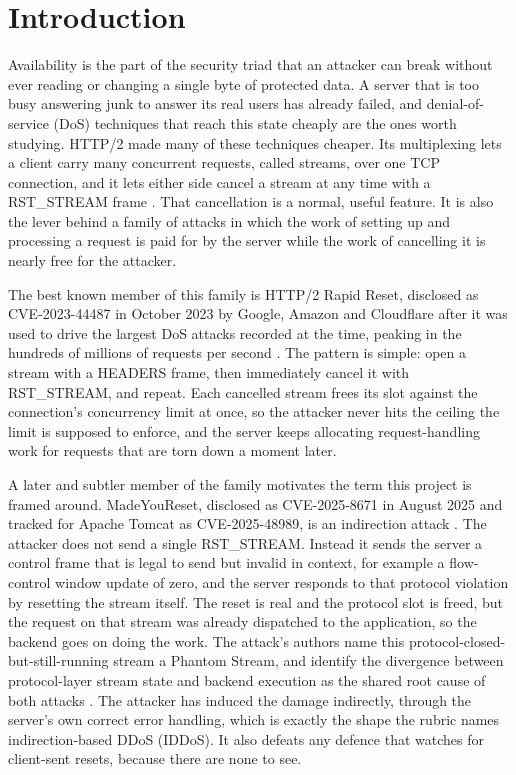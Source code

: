 \documentclass[a4paper,fleqn]{cas-dc}
\begin{document}
\section{Introduction}\label{sec:introduction}

Availability is the part of the security triad that an attacker can break without ever reading or changing a single byte of protected data. A server that is too busy answering junk to answer its real users has already failed, and denial-of-service (DoS) techniques that reach this state cheaply are the ones worth studying. HTTP/2 made many of these techniques cheaper. Its multiplexing lets a client carry many concurrent requests, called streams, over one TCP connection, and it lets either side cancel a stream at any time with a RST\_STREAM frame \cite{rfc9113}. That cancellation is a normal, useful feature. It is also the lever behind a family of attacks in which the work of setting up and processing a request is paid for by the server while the work of cancelling it is nearly free for the attacker.

The best known member of this family is HTTP/2 Rapid Reset, disclosed as CVE-2023-44487 in October 2023 by Google, Amazon and Cloudflare after it was used to drive the largest DoS attacks recorded at the time, peaking in the hundreds of millions of requests per second \cite{rapidresetCloudflare,cisaRapidReset}. The pattern is simple: open a stream with a HEADERS frame, then immediately cancel it with RST\_STREAM, and repeat. Each cancelled stream frees its slot against the connection's concurrency limit at once, so the attacker never hits the ceiling the limit is supposed to enforce, and the server keeps allocating request-handling work for requests that are torn down a moment later.

A later and subtler member of the family motivates the term this project is framed around. MadeYouReset, disclosed as CVE-2025-8671 in August 2025 and tracked for Apache Tomcat as CVE-2025-48989, is an indirection attack \cite{madeyouresetCloudflare,certccMadeYouReset,cve20258671,cve202548989}. The attacker does not send a single RST\_STREAM. Instead it sends the server a control frame that is legal to send but invalid in context, for example a flow-control window update of zero, and the server responds to that protocol violation by resetting the stream itself. The reset is real and the protocol slot is freed, but the request on that stream was already dispatched to the application, so the backend goes on doing the work. The attack's authors name this protocol-closed-but-still-running stream a Phantom Stream, and identify the divergence between protocol-layer stream state and backend execution as the shared root cause of both attacks \cite{madeyouresetPaper}. The attacker has induced the damage indirectly, through the server's own correct error handling, which is exactly the shape the rubric names indirection-based DDoS (IDDoS). It also defeats any defence that watches for client-sent resets, because there are none to see.
\end{document}
